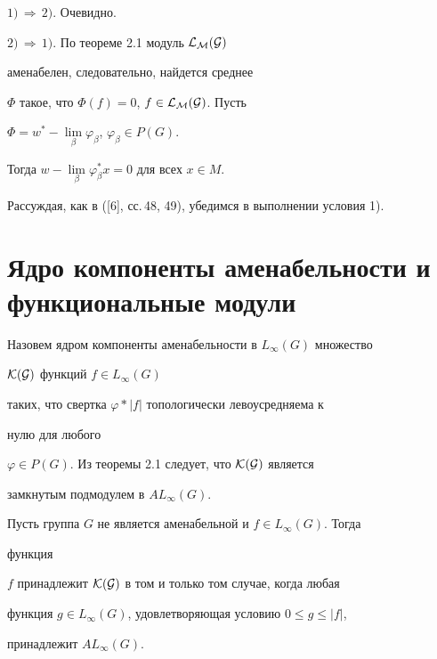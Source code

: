 \begin{pf}


$1)\,\Longrightarrow\,2)$. Очевидно.





$2)\,\Longrightarrow\,1)$. По теореме 2.1 модуль $\cal L_M(G)$


аменабелен, следовательно, найдется среднее


$\Phi$ такое, что $\Phi(f)=0$, $f\in\cal L_M(G)$. Пусть


$\Phi=w^*-\lim\limits_\beta\varphi_\beta$, $\varphi_\beta\in P(G)$.


Тогда $w-\lim\limits_\beta\varphi^*_\beta x=0$ для всех $x\in M$.


Рассуждая, как в ([6], сс.\,48, 49), убедимся в выполнении условия 1).


\end{pf}





\section{Ядро компоненты аменабельности и функциональные модули}





Назовем ядром компоненты аменабельности в $L_\infty(G)$ множество


$\cal K(G)$ функций $f\in L_\infty(G)$


таких, что свертка $\varphi\ast |f|$ топологически левоусредняема к


нулю для любого


$\varphi\in P(G)$. Из теоремы 2.1 следует, что $\cal K(G)$ является


замкнутым подмодулем в $AL_\infty(G)$.





\begin{thms}


Пусть группа $G$ не является аменабельной и $f\in L_\infty(G)$. Тогда


функция


$f$ принадлежит $\cal K(G)$ в том и только том случае, когда любая


функция $g\in L_\infty(G)$, удовлетворяющая условию $0\le g\le |f|$,


принадлежит $AL_\infty(G)$.


\end{thms}





